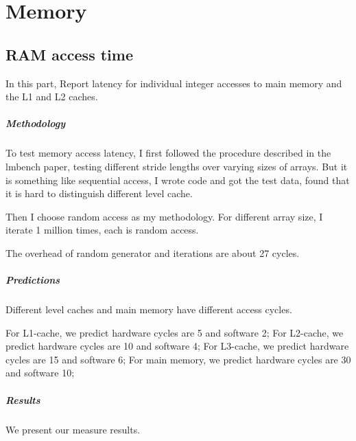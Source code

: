 \chapter{Memory}

\section{RAM access time}
In this part, Report latency for individual integer accesses to main memory and the L1 and L2 caches.

\paragraph{Methodology}
To test memory access latency, I first followed the procedure described in the lmbench paper, testing different stride lengths over varying sizes of arrays. But it is something like sequential access, I wrote code and got the test data, found that it is hard to distinguish different level cache.

Then I choose random access as my methodology. For different array size, I iterate 1 million times, each is random access.

The overhead of random generator and iterations are about  27 cycles.

\paragraph{Predictions}
Different level caches and main memory have different access cycles.

For L1-cache, we predict hardware cycles are 5 and software 2;
For L2-cache, we predict hardware cycles are 10 and software 4;
For L3-cache, we predict hardware cycles are 15 and software 6;
For main memory, we predict hardware cycles are 30 and software 10;

\paragraph{Results}
We present our measure results.

